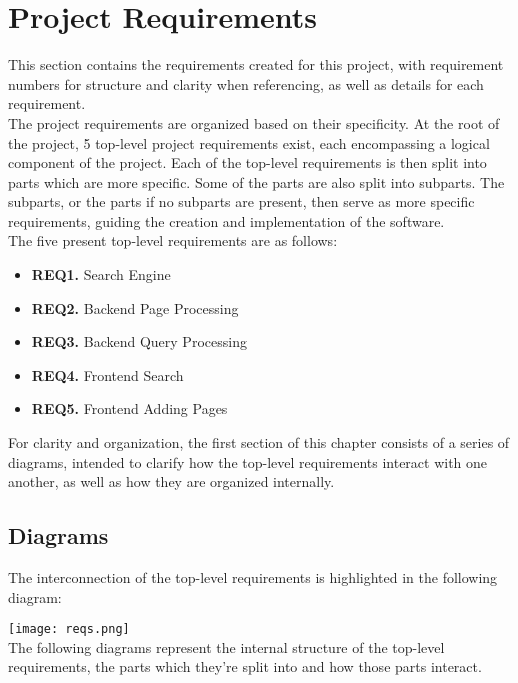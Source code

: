 \section{Project Requirements}

This section contains the requirements created for this project, with requirement numbers for structure and clarity when referencing, as well as details for each requirement.\\

The project requirements are organized based on their specificity. At the root of the project, 5 top-level project requirements exist, each encompassing a logical component of the project.
Each of the top-level requirements is then split into parts which are more specific. Some of the parts are also split into subparts. 
The subparts, or the parts if no subparts are present, then serve as more specific requirements, guiding the creation and implementation of the software.\\

The five present top-level requirements are as follows:
\begin{itemize}
    \item \textbf{REQ1.} Search Engine
    \item \textbf{REQ2.} Backend Page Processing
    \item \textbf{REQ3.} Backend Query Processing
    \item \textbf{REQ4.} Frontend Search
    \item \textbf{REQ5.} Frontend Adding Pages
\end{itemize}

For clarity and organization, the first section of this chapter consists of a series of diagrams, intended to clarify how the top-level requirements interact with one another,
as well as how they are organized internally.

\subsection{Diagrams}

The interconnection of the top-level requirements is highlighted in the following diagram:

\texttt{[image: reqs.png]}\\

The following diagrams represent the internal structure of the top-level requirements, the parts which they're split into and how those parts interact.\\

